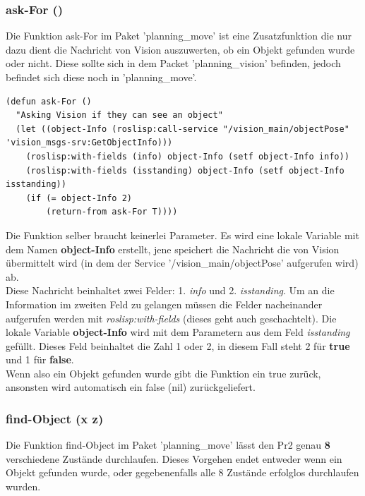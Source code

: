 \documentclass{suturo}
\begin{document}
\subsubsection{ask-For ()}

Die Funktion ask-For im Paket 'planning\_move' ist eine Zusatzfunktion die nur dazu dient die Nachricht von Vision auszuwerten, ob ein Objekt gefunden wurde oder nicht. Diese sollte sich in dem Packet 'planning\_vision' befinden, jedoch befindet sich diese noch in 'planning\_move'.

\noindent
\begin{minipage}{\linewidth}
\begin{lstlisting}
(defun ask-For ()
  "Asking Vision if they can see an object"
  (let ((object-Info (roslisp:call-service "/vision_main/objectPose" 'vision_msgs-srv:GetObjectInfo)))
    (roslisp:with-fields (info) object-Info (setf object-Info info))
    (roslisp:with-fields (isstanding) object-Info (setf object-Info isstanding))
    (if (= object-Info 2)
        (return-from ask-For T))))
\end{lstlisting}
\end{minipage}

Die Funktion selber braucht keinerlei Parameter. Es wird eine lokale Variable mit dem Namen \textbf{object-Info} erstellt, jene speichert die Nachricht die von Vision übermittelt wird (in dem der Service '/vision\_main/objectPose' aufgerufen wird) ab.\\

 Diese Nachricht beinhaltet zwei Felder: 1. \textit{info} und 2. \textit{isstanding}. Um an die Information im zweiten Feld zu gelangen müssen die Felder nacheinander aufgerufen werden mit \textit{roslisp:with-fields} (dieses geht auch geschachtelt). Die lokale Variable \textbf{object-Info} wird mit dem Parametern aus dem Feld \textit{isstanding} gefüllt. Dieses Feld beinhaltet die Zahl 1 oder 2, in diesem Fall steht 2 für \textbf{true} und 1 für \textbf{false}.\\
 
  Wenn also ein Objekt gefunden wurde gibt die Funktion ein true zurück, ansonsten wird automatisch ein false (nil) zurückgeliefert. 




\subsubsection{find-Object (x z)}
Die Funktion find-Object im Paket 'planning\_move' lässt den Pr2 genau \textbf{8} verschiedene Zustände durchlaufen. Dieses Vorgehen endet entweder wenn ein Objekt gefunden wurde, oder gegebenenfalls alle 8 Zustände erfolglos durchlaufen wurden.
\end{document}
